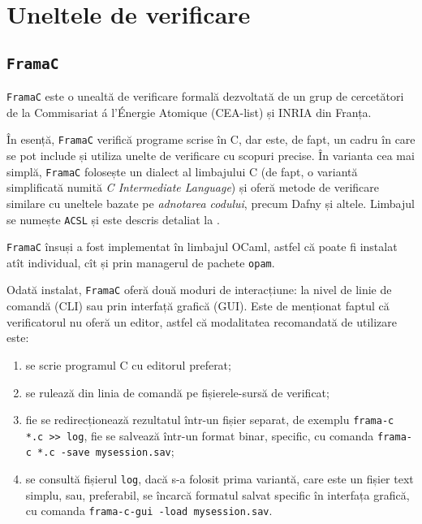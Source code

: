 \chapter{Uneltele de verificare}

\section{\texttt{FramaC}}

\indent\indent \texttt{FramaC} este o unealtă de verificare formală dezvoltată
de un grup de cercetători de la Commisariat \'a l'\'Energie Atomique (CEA-list)
și INRIA din Franța.

În esență, \texttt{FramaC} verifică programe scrise în C, dar este, de fapt,
un cadru în care se pot include și utiliza unelte de verificare cu scopuri precise.
În varianta cea mai simplă, \texttt{FramaC} folosește un dialect al limbajului C
(de fapt, o variantă simplificată numită \emph{C Intermediate Language}) și oferă
metode de verificare similare cu uneltele bazate pe \emph{adnotarea codului},
precum Dafny și altele. Limbajul se numește \texttt{ACSL} și este descris detaliat
la \cite{acsl}.

\texttt{FramaC} însuși a fost implementat în limbajul OCaml, astfel că poate
fi instalat atît individual, cît și prin managerul de pachete \texttt{opam}.

Odată instalat, \texttt{FramaC} oferă două moduri de interacțiune: la nivel
de linie de comandă (CLI) sau prin interfață grafică (GUI). Este de menționat
faptul că verificatorul nu oferă un editor, astfel că modalitatea recomandată
de utilizare este:
\begin{enumerate}[(1)]
\item se scrie programul C cu editorul preferat;
\item se rulează din linia de comandă pe fișierele-sursă
  de verificat;
\item fie se redirecționează rezultatul într-un fișier separat, de exemplu
  \texttt{frama-c *.c >> log}, fie se salvează într-un format binar, specific,
  cu comanda \texttt{frama-c *.c -save mysession.sav};
\item se consultă fișierul \texttt{log}, dacă s-a folosit prima variantă,
  care este un fișier text simplu, sau, preferabil, se încarcă formatul
  salvat specific în interfața grafică, cu comanda \texttt{frama-c-gui -load mysession.sav}.
\end{enumerate}


